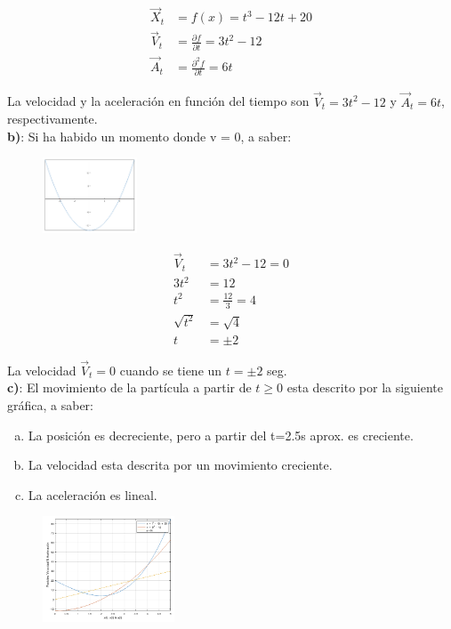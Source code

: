 \documentclass[11pt,letterpaper]{article}
\begin{document}
\begin{align}
	\vec{X}_{t} &= f(x) = t^3 - 12t + 20\\
	\vec{V}_{t} &= \frac{\partial f}{\partial t} = 3t^2 - 12\\
	\vec{A}_{t} &= \frac{\partial^2 f}{\partial t} = 6t
\end{align}

La velocidad y la aceleración en función del tiempo son $\vec{V}_{t}=3t^2 - 12$ y $\vec{A}_{t} = 6t$, respectivamente.\\

\textbf{b)}: Si ha habido un momento donde v = 0, a saber:

\begin{figure}
    \centering
    \includegraphics[width=0.25\textwidth]{ejemplo_3_punto_2.png}
\end{figure}

\begin{align*}
	\vec{V}_{t} &= 3t^2 - 12 = 0\\
	3t^2 &= 12\\
	t^2 &= \frac{12}{3} = 4\\
	\sqrt{t^2} &= \sqrt{4}\\
	t &= \pm 2
\end{align*}

La velocidad $\vec{V}_{t}=0$ cuando se tiene un $t = \pm 2$ seg.\\

\textbf{c)}: El movimiento de la partícula a partir de $t \ge 0$ esta descrito por la siguiente gráfica, a saber:

\begin{enumerate}[(a)] 
\item {La posición es decreciente, pero a partir del t=2.5s aprox. es creciente.}
\item {La velocidad esta descrita por un movimiento creciente.}
\item {La aceleración es lineal.}
\end{enumerate}

\begin{figure}
    \centering
    \includegraphics[width=0.35\textwidth]{ejemplo_3_punto_3.png}
\end{figure}

\end{document}
